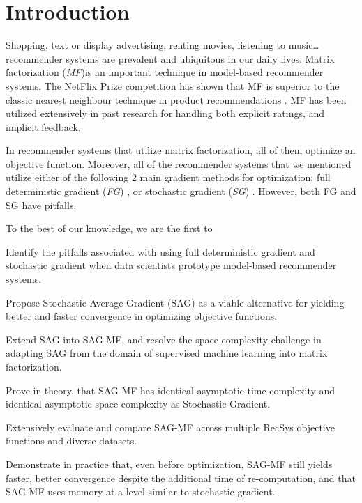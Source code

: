 \section{Introduction}
Shopping, text or display advertising, renting movies, listening to music… recommender systems are prevalent and ubiquitous in our daily lives.  
Matrix factorization (\emph{MF})is an important technique in model-based recommender systems.
The NetFlix Prize competition has shown that MF is superior to the classic nearest neighbour technique in product recommendations \cite{koren2009matrix}.
MF has been utilized extensively in past research for handling both explicit \cite{mmmf2005fast, mnar, gapfm} ratings, and implicit \cite{wrmf2008hu, wrmf2008pan, climf, bpr, mnar} feedback.

In recommender systems that utilize matrix factorization, all of them optimize an objective function.  
Moreover, all of the recommender systems that we mentioned utilize either of the following 2 main gradient methods for optimization: full deterministic gradient (\emph{FG}) \cite{mmmf2005fast, wrmf2008hu, wrmf2008pan, mnar}, or stochastic gradient (\emph{SG}) \cite{gapfm, climf, bpr}.
However, both FG and SG have pitfalls.  



To the best of our knowledge, we are the first to
\begin{compactitem}
\item Identify the pitfalls associated with using full deterministic gradient and stochastic gradient when data scientists prototype model-based recommender systems.
\item Propose Stochastic Average Gradient (SAG) as a viable alternative for yielding better and faster convergence in optimizing objective functions.
\item Extend SAG into SAG-MF, and resolve the space complexity challenge in adapting SAG from the domain of supervised machine learning into matrix factorization.
\item Prove in theory, that SAG-MF has identical asymptotic time complexity and identical asymptotic space complexity as Stochastic Gradient.
\item Extensively evaluate and compare SAG-MF across multiple RecSys objective functions and diverse datasets.
\item Demonstrate in practice that, even before optimization, SAG-MF still yields faster, better convergence despite the additional time of re-computation, and that SAG-MF uses memory at a level similar to stochastic gradient.  
\end {compactitem}


